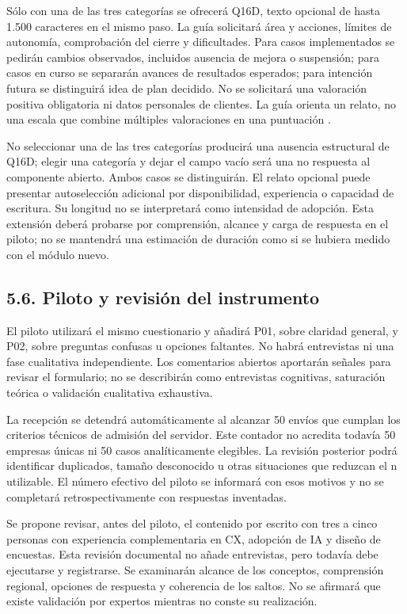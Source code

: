 \documentclass[12pt,letterpaper]{article}
\begin{document}
Sólo con una de las tres categorías se ofrecerá Q16D, texto opcional de hasta 1.500 caracteres en el mismo paso. La guía solicitará área y acciones, límites de autonomía, comprobación del cierre y dificultades. Para casos implementados se pedirán cambios observados, incluidos ausencia de mejora o suspensión; para casos en curso se separarán avances de resultados esperados; para intención futura se distinguirá idea de plan decidido. No se solicitará una valoración positiva obligatoria ni datos personales de clientes. La guía orienta un relato, no una escala que combine múltiples valoraciones en una puntuación \citep{pew}.

No seleccionar una de las tres categorías producirá una ausencia estructural de Q16D; elegir una categoría y dejar el campo vacío será una no respuesta al componente abierto. Ambos casos se distinguirán. El relato opcional puede presentar autoselección adicional por disponibilidad, experiencia o capacidad de escritura. Su longitud no se interpretará como intensidad de adopción. Esta extensión deberá probarse por comprensión, alcance y carga de respuesta en el piloto; no se mantendrá una estimación de duración como si se hubiera medido con el módulo nuevo.

\subsection*{5.6. Piloto y revisión del instrumento}
El piloto utilizará el mismo cuestionario y añadirá P01, sobre claridad general, y P02, sobre preguntas confusas u opciones faltantes. No habrá entrevistas ni una fase cualitativa independiente. Los comentarios abiertos aportarán señales para revisar el formulario; no se describirán como entrevistas cognitivas, saturación teórica o validación cualitativa exhaustiva.

La recepción se detendrá automáticamente al alcanzar 50 envíos que cumplan los criterios técnicos de admisión del servidor. Este contador no acredita todavía 50 empresas únicas ni 50 casos analíticamente elegibles. La revisión posterior podrá identificar duplicados, tamaño desconocido u otras situaciones que reduzcan el n utilizable. El número efectivo del piloto se informará con esos motivos y no se completará retrospectivamente con respuestas inventadas.

Se propone revisar, antes del piloto, el contenido por escrito con tres a cinco personas con experiencia complementaria en CX, adopción de IA y diseño de encuestas. Esta revisión documental no añade entrevistas, pero todavía debe ejecutarse y registrarse. Se examinarán alcance de los conceptos, comprensión regional, opciones de respuesta y coherencia de los saltos. No se afirmará que existe validación por expertos mientras no conste su realización.
\end{document}
